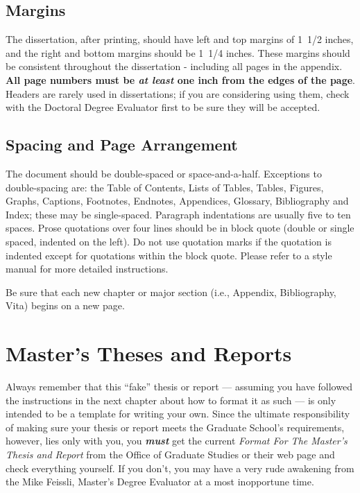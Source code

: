 \subsection{Margins}
%

The dissertation, after printing, should have left and top margins of
1~1/2 inches, and the right and bottom margins should be 1~1/4 inches.
These margins should be consistent throughout the dissertation - including
all pages in the appendix. \textbf{All page numbers must be \textit{at
least} one inch from the edges of the page}. Headers are rarely used in
dissertations; if you are considering using them, check with the Doctoral
Degree Evaluator first to be sure they will be accepted.


\subsection{Spacing and Page Arrangement}
%
%

The document should be double-spaced or space-and-a-half. 
Exceptions to double-spacing are: the Table of Contents, Lists of Tables, 
Tables, Figures, Graphs, Captions, Footnotes, Endnotes, 
Appendices, Glossary, Bibliography and Index; these may 
be single-spaced. Paragraph indentations are usually five to ten 
spaces. Prose quotations over four lines should be in 
block quote (double or single spaced, indented on the left). 
Do not use quotation marks if the quotation is indented except for
quotations within the block quote. Please refer to a style manual for
more detailed instructions.

Be sure that each new chapter or major section (i.e., Appendix, Bibliography,
Vita) begins on a new page.

\section{Master's Theses and Reports}

Always remember that this ``fake'' thesis or report 
%
--- assuming you have followed the instructions in the next chapter about
how to format it as such --- is only intended to be a template for writing
your own. Since the ultimate responsibility of making sure your thesis or
report meets the Graduate School's requirements, however, lies only with
you, you \textbf{\textit{must}} get the current \emph{Format For The
Master's Thesis and Report} from the Office of Graduate Studies or their web
page and check everything yourself. If you don't, you may have a very
rude awakening from the Mike Feissli, Master's Degree Evaluator at a most
inopportune time.

